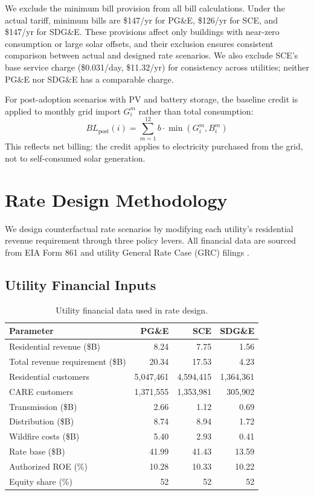 \documentclass[11pt]{article}
\begin{document}
We exclude the minimum bill provision from all bill calculations. Under the actual tariff, minimum bills are \$147/yr for PG\&E, \$126/yr for SCE, and \$147/yr for SDG\&E. These provisions affect only buildings with near-zero consumption or large solar offsets, and their exclusion ensures consistent comparison between actual and designed rate scenarios. We also exclude SCE's base service charge (\$0.031/day, \$11.32/yr) for consistency across utilities; neither PG\&E nor SDG\&E has a comparable charge.

For post-adoption scenarios with PV and battery storage, the baseline credit is applied to monthly grid import $G_i^m$ rather than total consumption:
\begin{equation}
BL_{\text{post}}(i) = \sum_{m=1}^{12} b \cdot \min(G_i^m, B_i^m)
\end{equation}
This reflects net billing: the credit applies to electricity purchased from the grid, not to self-consumed solar generation.

\section{Rate Design Methodology}
\label{sec:rate_design}

We design counterfactual rate scenarios by modifying each utility's residential revenue requirement through three policy levers. All financial data are sourced from EIA Form 861 and utility General Rate Case (GRC) filings \cite{cpuc2024}.

\subsection{Utility Financial Inputs}

\begin{table}[htbp]
\centering
\caption{Utility financial data used in rate design.}
\label{tab:utility_financial}
\small
\begin{tabular}{l r r r}
\toprule
\textbf{Parameter} & \textbf{PG\&E} & \textbf{SCE} & \textbf{SDG\&E} \\
\midrule
Residential revenue (\$B) & 8.24 & 7.75 & 1.56 \\
Total revenue requirement (\$B) & 20.34 & 17.53 & 4.23 \\
Residential customers & 5,047,461 & 4,594,415 & 1,364,361 \\
CARE customers & 1,371,555 & 1,353,981 & 305,902 \\
\midrule
Transmission (\$B) & 2.66 & 1.12 & 0.69 \\
Distribution (\$B) & 8.74 & 8.94 & 1.72 \\
Wildfire costs (\$B) & 5.40 & 2.93 & 0.41 \\
\midrule
Rate base (\$B) & 41.99 & 41.43 & 13.59 \\
Authorized ROE (\%) & 10.28 & 10.33 & 10.22 \\
Equity share (\%) & 52 & 52 & 52 \\
\bottomrule
\end{tabular}
\end{table}
\end{document}
